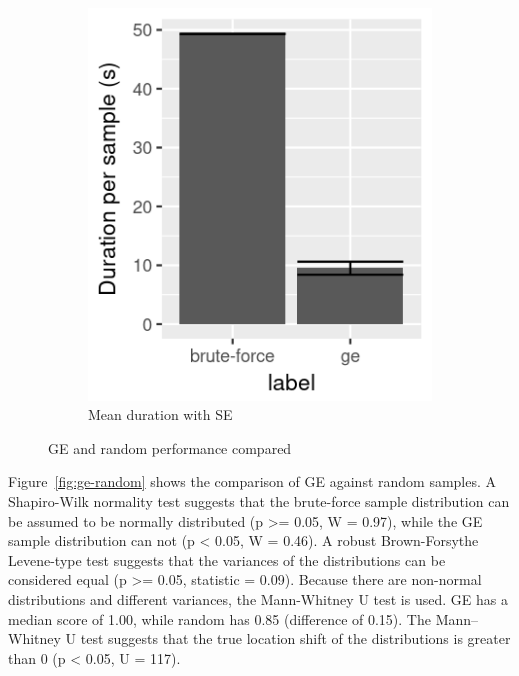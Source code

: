 \begin{figure}
\begin{subfigure}{0.4\textwidth}
        \includegraphics[width=\textwidth]{figures/ge-random-duration}
        \caption{Mean duration with SE}
        \label{fig:ge-random-duration}
    \end{subfigure}
    \caption[GE and random performance compared]{\gls{GE} and random performance compared}
\end{figure}

Figure~\ref{fig:ge-random} shows the comparison of \gls{GE} against random samples.
A Shapiro-Wilk normality test suggests that the brute-force sample distribution can be assumed to be normally distributed (p >= 0.05, W = 0.97), while the \gls{GE} sample distribution can not (p < 0.05, W = 0.46).
A robust Brown-Forsythe Levene-type test suggests that the variances of the distributions can be considered equal (p >= 0.05, statistic = 0.09).
Because there are non-normal distributions and different variances, the Mann-Whitney U test is used.
\gls{GE} has a median score of 1.00, while random has 0.85 (difference of 0.15).
The Mann–Whitney U test suggests that the true location shift of the distributions is greater than 0 (p < 0.05, U = 117).

